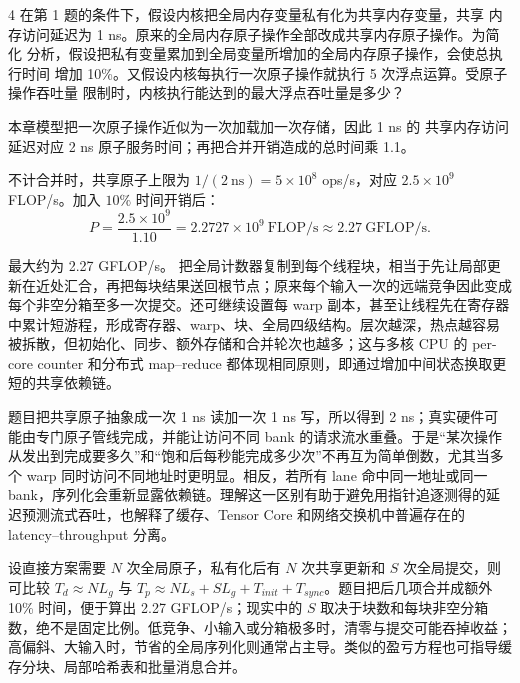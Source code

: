 \begin{solutionexercise}{4}
\problemheading 在第 1 题的条件下，假设内核把全局内存变量私有化为共享内存变量，共享
内存访问延迟为 1 ns。原来的全局内存原子操作全部改成共享内存原子操作。为简化
分析，假设把私有变量累加到全局变量所增加的全局内存原子操作，会使总执行时间
增加 10\%。又假设内核每执行一次原子操作就执行 5 次浮点运算。受原子操作吞吐量
限制时，内核执行能达到的最大浮点吞吐量是多少？

\approachheading 本章模型把一次原子操作近似为一次加载加一次存储，因此 1 ns 的
共享内存访问延迟对应 2 ns 原子服务时间；再把合并开销造成的总时间乘 1.1。

\answerheading 不计合并时，共享原子上限为
$1/(2\ \mathrm{ns})=5\times10^8$ ops/s，对应 $2.5\times10^9$ FLOP/s。加入
$10\%$ 时间开销后：
\[
P=\frac{2.5\times10^9}{1.10}
=2.2727\times10^9\ \mathrm{FLOP/s}
\approx2.27\ \mathrm{GFLOP/s}.
\]

\conclusionheading 最大约为 2.27 GFLOP/s。
\discussionheading
{}把全局计数器复制到每个线程块，相当于先让局部更新在近处汇合，再把每块结果送回根节点；原来每个输入一次的远端竞争因此变成每个非空分箱至多一次提交。还可继续设置每 warp 副本，甚至让线程先在寄存器中累计短游程，形成寄存器、warp、块、全局四级结构。层次越深，热点越容易被拆散，但初始化、同步、额外存储和合并轮次也越多；这与多核 CPU 的 per-core counter 和分布式 map--reduce 都体现相同原则，即通过增加中间状态换取更短的共享依赖链。

题目把共享原子抽象成一次 1 ns 读加一次 1 ns 写，所以得到 2 ns；真实硬件可能由专门原子管线完成，并能让访问不同 bank 的请求流水重叠。于是“某次操作从发出到完成要多久”和“饱和后每秒能完成多少次”不再互为简单倒数，尤其当多个 warp 同时访问不同地址时更明显。相反，若所有 lane 命中同一地址或同一 bank，序列化会重新显露依赖链。理解这一区别有助于避免用指针追逐测得的延迟预测流式吞吐，也解释了缓存、Tensor Core 和网络交换机中普遍存在的 latency--throughput 分离。

设直接方案需要 $N$ 次全局原子，私有化后有 $N$ 次共享更新和 $S$ 次全局提交，则可比较 $T_d\approx NL_g$ 与 $T_p\approx NL_s+SL_g+T_{init}+T_{sync}$。题目把后几项合并成额外 10\% 时间，便于算出 2.27 GFLOP/s；现实中的 $S$ 取决于块数和每块非空分箱数，绝不是固定比例。低竞争、小输入或分箱极多时，清零与提交可能吞掉收益；高偏斜、大输入时，节省的全局序列化则通常占主导。类似的盈亏方程也可指导缓存分块、局部哈希表和批量消息合并。


\end{solutionexercise}
